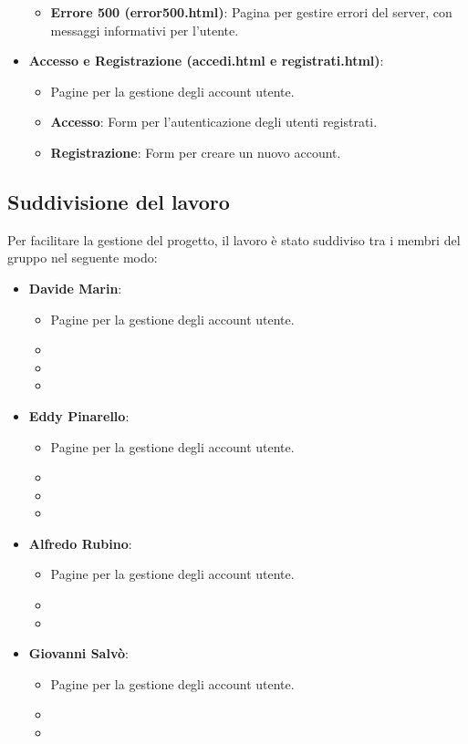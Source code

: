 \documentclass[a4paper, 12pt]{article}
\begin{document}
\begin{justify}
\begin{itemize}
\begin{itemize}
            \item \textbf{Errore 500 (error500.html)}: Pagina per gestire errori del server, con messaggi informativi per l'utente.
        \end{itemize}
    \item \textbf{Accesso e Registrazione (accedi.html e registrati.html)}:
        \begin{itemize}
            \item Pagine per la gestione degli account utente.
            \item \textbf{Accesso}: Form per l'autenticazione degli utenti registrati.
            \item \textbf{Registrazione}: Form per creare un nuovo account.
        \end{itemize}
\end{itemize}

\subsection{Suddivisione del lavoro}
Per facilitare la gestione del progetto, il lavoro è stato suddiviso tra i membri del gruppo nel seguente modo:
\begin{itemize}
    \item \textbf{Davide Marin}: 
        \begin{itemize}
            \item Pagine per la gestione degli account utente.
            \item
            \item
            \item 
        \end{itemize}
    \item \textbf{Eddy Pinarello}:
        \begin{itemize}
            \item Pagine per la gestione degli account utente.
            \item
            \item
            \item
        \end{itemize}
    \item \textbf{Alfredo Rubino}:
        \begin{itemize}
            \item Pagine per la gestione degli account utente.
            \item
            \item
        \end{itemize}
    \item \textbf{Giovanni Salvò}:
        \begin{itemize}
            \item Pagine per la gestione degli account utente.
            \item
            \item
        \end{itemize}
\end{itemize}



\end{justify}
\end{document}
